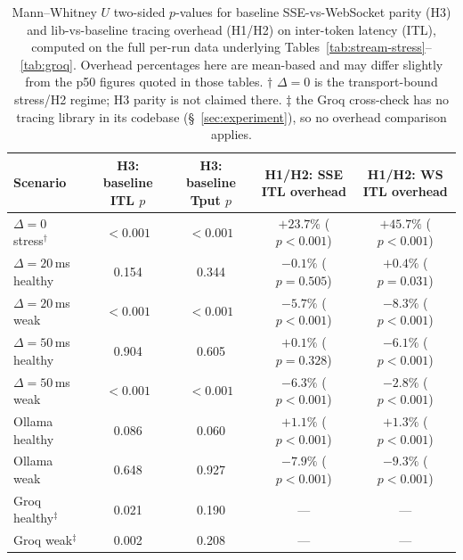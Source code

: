 \documentclass[11pt]{article}
\begin{document}
\begin{table}[H]
\centering\footnotesize
\caption{Mann--Whitney $U$ two-sided $p$-values for baseline SSE-vs-WebSocket parity (H3) and lib-vs-baseline tracing overhead (H1/H2) on inter-token latency (ITL), computed on the full per-run data underlying Tables~\ref{tab:stream-stress}--\ref{tab:groq}. Overhead percentages here are mean-based and may differ slightly from the p50 figures quoted in those tables. $\dagger$ $\Delta=0$ is the transport-bound stress/H2 regime; H3 parity is not claimed there. $\ddagger$ the Groq cross-check has no tracing library in its codebase (\S~\ref{sec:experiment}), so no overhead comparison applies.}
\label{tab:sigtest}
\begin{tabular}{@{}lcccc@{}}
\toprule
Scenario & H3: baseline ITL $p$ & H3: baseline Tput $p$ & H1/H2: SSE ITL overhead & H1/H2: WS ITL overhead \\
\midrule
$\Delta=0$ stress$^\dagger$ & $<0.001$ & $<0.001$ & $+23.7\%$ ($p<0.001$) & $+45.7\%$ ($p<0.001$) \\
$\Delta=20$\,ms healthy & 0.154 & 0.344 & $-0.1\%$ ($p=0.505$) & $+0.4\%$ ($p=0.031$) \\
$\Delta=20$\,ms weak & $<0.001$ & $<0.001$ & $-5.7\%$ ($p<0.001$) & $-8.3\%$ ($p<0.001$) \\
$\Delta=50$\,ms healthy & 0.904 & 0.605 & $+0.1\%$ ($p=0.328$) & $-6.1\%$ ($p<0.001$) \\
$\Delta=50$\,ms weak & $<0.001$ & $<0.001$ & $-6.3\%$ ($p<0.001$) & $-2.8\%$ ($p<0.001$) \\
Ollama healthy & 0.086 & 0.060 & $+1.1\%$ ($p<0.001$) & $+1.3\%$ ($p<0.001$) \\
Ollama weak & 0.648 & 0.927 & $-7.9\%$ ($p<0.001$) & $-9.3\%$ ($p<0.001$) \\
Groq healthy$^\ddagger$ & 0.021 & 0.190 & --- & --- \\
Groq weak$^\ddagger$ & 0.002 & 0.208 & --- & --- \\
\bottomrule
\end{tabular}
\end{table}
\end{document}
